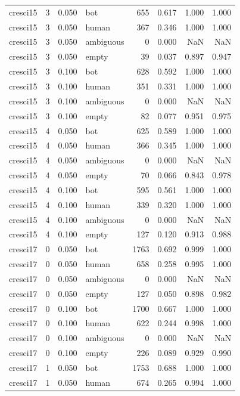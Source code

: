 \begin{tabular}{lrrlrrrr}
cresci15 & 3 & 0.050 & bot & 655 & 0.617 & 1.000 & 1.000 \\
cresci15 & 3 & 0.050 & human & 367 & 0.346 & 1.000 & 1.000 \\
cresci15 & 3 & 0.050 & ambiguous & 0 & 0.000 & NaN & NaN \\
cresci15 & 3 & 0.050 & empty & 39 & 0.037 & 0.897 & 0.947 \\
cresci15 & 3 & 0.100 & bot & 628 & 0.592 & 1.000 & 1.000 \\
cresci15 & 3 & 0.100 & human & 351 & 0.331 & 1.000 & 1.000 \\
cresci15 & 3 & 0.100 & ambiguous & 0 & 0.000 & NaN & NaN \\
cresci15 & 3 & 0.100 & empty & 82 & 0.077 & 0.951 & 0.975 \\
cresci15 & 4 & 0.050 & bot & 625 & 0.589 & 1.000 & 1.000 \\
cresci15 & 4 & 0.050 & human & 366 & 0.345 & 1.000 & 1.000 \\
cresci15 & 4 & 0.050 & ambiguous & 0 & 0.000 & NaN & NaN \\
cresci15 & 4 & 0.050 & empty & 70 & 0.066 & 0.843 & 0.978 \\
cresci15 & 4 & 0.100 & bot & 595 & 0.561 & 1.000 & 1.000 \\
cresci15 & 4 & 0.100 & human & 339 & 0.320 & 1.000 & 1.000 \\
cresci15 & 4 & 0.100 & ambiguous & 0 & 0.000 & NaN & NaN \\
cresci15 & 4 & 0.100 & empty & 127 & 0.120 & 0.913 & 0.988 \\
cresci17 & 0 & 0.050 & bot & 1763 & 0.692 & 0.999 & 1.000 \\
cresci17 & 0 & 0.050 & human & 658 & 0.258 & 0.995 & 1.000 \\
cresci17 & 0 & 0.050 & ambiguous & 0 & 0.000 & NaN & NaN \\
cresci17 & 0 & 0.050 & empty & 127 & 0.050 & 0.898 & 0.982 \\
cresci17 & 0 & 0.100 & bot & 1700 & 0.667 & 1.000 & 1.000 \\
cresci17 & 0 & 0.100 & human & 622 & 0.244 & 0.998 & 1.000 \\
cresci17 & 0 & 0.100 & ambiguous & 0 & 0.000 & NaN & NaN \\
cresci17 & 0 & 0.100 & empty & 226 & 0.089 & 0.929 & 0.990 \\
cresci17 & 1 & 0.050 & bot & 1753 & 0.688 & 1.000 & 1.000 \\
cresci17 & 1 & 0.050 & human & 674 & 0.265 & 0.994 & 1.000 \\

\end{tabular}
